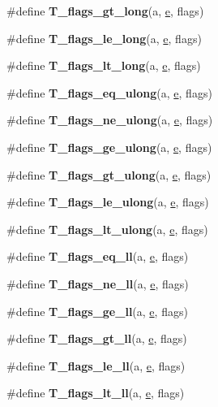 \begin{DoxyCompactItemize}
\item 
\#define {\bfseries T\+\_\+flags\+\_\+gt\+\_\+long}(a,  \mbox{\hyperlink{sun4u_2tte_8h_a8b0b9ed08e0e18920ec2682f48228c27}{e}},  flags)
\item 
\#define {\bfseries T\+\_\+flags\+\_\+le\+\_\+long}(a,  \mbox{\hyperlink{sun4u_2tte_8h_a8b0b9ed08e0e18920ec2682f48228c27}{e}},  flags)
\item 
\#define {\bfseries T\+\_\+flags\+\_\+lt\+\_\+long}(a,  \mbox{\hyperlink{sun4u_2tte_8h_a8b0b9ed08e0e18920ec2682f48228c27}{e}},  flags)
\item 
\#define {\bfseries T\+\_\+flags\+\_\+eq\+\_\+ulong}(a,  \mbox{\hyperlink{sun4u_2tte_8h_a8b0b9ed08e0e18920ec2682f48228c27}{e}},  flags)
\item 
\#define {\bfseries T\+\_\+flags\+\_\+ne\+\_\+ulong}(a,  \mbox{\hyperlink{sun4u_2tte_8h_a8b0b9ed08e0e18920ec2682f48228c27}{e}},  flags)
\item 
\#define {\bfseries T\+\_\+flags\+\_\+ge\+\_\+ulong}(a,  \mbox{\hyperlink{sun4u_2tte_8h_a8b0b9ed08e0e18920ec2682f48228c27}{e}},  flags)
\item 
\#define {\bfseries T\+\_\+flags\+\_\+gt\+\_\+ulong}(a,  \mbox{\hyperlink{sun4u_2tte_8h_a8b0b9ed08e0e18920ec2682f48228c27}{e}},  flags)
\item 
\#define {\bfseries T\+\_\+flags\+\_\+le\+\_\+ulong}(a,  \mbox{\hyperlink{sun4u_2tte_8h_a8b0b9ed08e0e18920ec2682f48228c27}{e}},  flags)
\item 
\#define {\bfseries T\+\_\+flags\+\_\+lt\+\_\+ulong}(a,  \mbox{\hyperlink{sun4u_2tte_8h_a8b0b9ed08e0e18920ec2682f48228c27}{e}},  flags)
\item 
\#define {\bfseries T\+\_\+flags\+\_\+eq\+\_\+ll}(a,  \mbox{\hyperlink{sun4u_2tte_8h_a8b0b9ed08e0e18920ec2682f48228c27}{e}},  flags)
\item 
\#define {\bfseries T\+\_\+flags\+\_\+ne\+\_\+ll}(a,  \mbox{\hyperlink{sun4u_2tte_8h_a8b0b9ed08e0e18920ec2682f48228c27}{e}},  flags)
\item 
\#define {\bfseries T\+\_\+flags\+\_\+ge\+\_\+ll}(a,  \mbox{\hyperlink{sun4u_2tte_8h_a8b0b9ed08e0e18920ec2682f48228c27}{e}},  flags)
\item 
\#define {\bfseries T\+\_\+flags\+\_\+gt\+\_\+ll}(a,  \mbox{\hyperlink{sun4u_2tte_8h_a8b0b9ed08e0e18920ec2682f48228c27}{e}},  flags)
\item 
\#define {\bfseries T\+\_\+flags\+\_\+le\+\_\+ll}(a,  \mbox{\hyperlink{sun4u_2tte_8h_a8b0b9ed08e0e18920ec2682f48228c27}{e}},  flags)
\item 
\#define {\bfseries T\+\_\+flags\+\_\+lt\+\_\+ll}(a,  \mbox{\hyperlink{sun4u_2tte_8h_a8b0b9ed08e0e18920ec2682f48228c27}{e}},  flags)

\end{DoxyCompactItemize}
